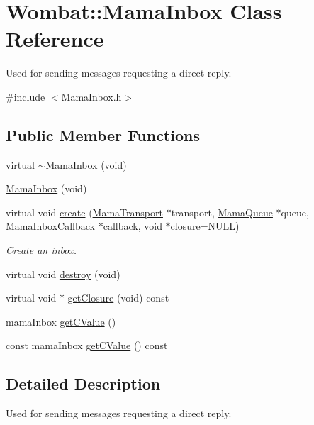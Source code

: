 \hypertarget{classWombat_1_1MamaInbox}{
\section{Wombat::MamaInbox Class Reference}
\label{classWombat_1_1MamaInbox}
}


Used for sending messages requesting a direct reply.  


{\ttfamily \#include $<$MamaInbox.h$>$}\subsection*{Public Member Functions}
\begin{DoxyCompactItemize}
\item 
virtual \hyperlink{classWombat_1_1MamaInbox_aff9af1b965c0992572aa78d707f5d6e4}{$\sim$MamaInbox} (void)
\item 
\hyperlink{classWombat_1_1MamaInbox_adece7f7df25fd1b43de4752305e7db83}{MamaInbox} (void)
\item 
virtual void \hyperlink{classWombat_1_1MamaInbox_ad42be13e492647407ce0941b0ce41eec}{create} (\hyperlink{classWombat_1_1MamaTransport}{MamaTransport} $\ast$transport, \hyperlink{classWombat_1_1MamaQueue}{MamaQueue} $\ast$queue, \hyperlink{classWombat_1_1MamaInboxCallback}{MamaInboxCallback} $\ast$callback, void $\ast$closure=NULL)
\begin{DoxyCompactList}\small\item\em Create an inbox. \item\end{DoxyCompactList}\item 
virtual void \hyperlink{classWombat_1_1MamaInbox_ac39e457892aa15e908ce28211580feca}{destroy} (void)
\item 
virtual void $\ast$ \hyperlink{classWombat_1_1MamaInbox_ac269097bbab63c1196746de167164053}{getClosure} (void) const 
\item 
mamaInbox \hyperlink{classWombat_1_1MamaInbox_a1ca3b952c2c19c008e7efcce340e683f}{getCValue} ()
\item 
const mamaInbox \hyperlink{classWombat_1_1MamaInbox_aec99b00cb3ed6b6d77331dd052efa7c3}{getCValue} () const 
\end{DoxyCompactItemize}


\subsection{Detailed Description}
Used for sending messages requesting a direct reply. 

